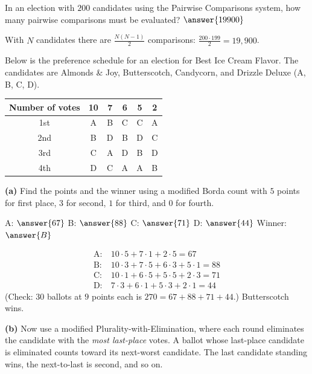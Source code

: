 \documentclass[12pt]{ximera}
\begin{document}
\begin{problem}
In an election with $200$ candidates using the Pairwise Comparisons system, how many
pairwise comparisons must be evaluated? $\answer{19900}$

\begin{feedback}
With $N$ candidates there are $\frac{N(N-1)}{2}$ comparisons:
$\frac{200\cdot199}{2}=19{,}900$.
\end{feedback}
\end{problem}

\begin{problem}
Below is the preference schedule for an election for Best Ice Cream Flavor. The candidates are
Almonds \& Joy, Butterscotch, Candycorn, and Drizzle Deluxe (A, B, C, D).
\begin{center}
\begin{tabular}{c|ccccc}
Number of votes & 10 & 7 & 6 & 5 & 2\\\hline
1st & A & B & C & C & A\\
2nd & B & D & B & D & C\\
3rd & C & A & D & B & D\\
4th & D & C & A & A & B
\end{tabular}
\end{center}

\begin{prompt}
\textbf{(a)} Find the points and the winner using a modified Borda count with $5$
points for first place, $3$ for second, $1$ for third, and $0$ for fourth.

A: $\answer{67}$ \quad B: $\answer{88}$ \quad C: $\answer{71}$ \quad D: $\answer{44}$
\qquad Winner: $\answer{B}$

\begin{feedback}
\[
\begin{aligned}
\text{A:}&\ 10\cdot5+7\cdot1+2\cdot5=67\\
\text{B:}&\ 10\cdot3+7\cdot5+6\cdot3+5\cdot1=88\\
\text{C:}&\ 10\cdot1+6\cdot5+5\cdot5+2\cdot3=71\\
\text{D:}&\ 7\cdot3+6\cdot1+5\cdot3+2\cdot1=44
\end{aligned}
\]
(Check: $30$ ballots at $9$ points each is $270=67+88+71+44$.) Butterscotch wins.
\end{feedback}
\end{prompt}

\begin{prompt}
\textbf{(b)} Now use a modified Plurality-with-Elimination, where each round eliminates
the candidate with the \emph{most last-place} votes. A ballot whose last-place candidate
is eliminated counts toward its next-worst candidate. The last candidate standing wins,
the next-to-last is second, and so on.


\end{prompt}
\end{problem}
\end{document}
